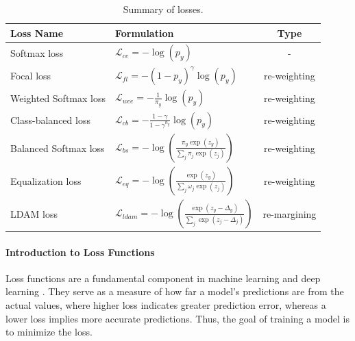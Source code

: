 \begin{table}[H]
    \centering
    \caption{Summary of losses.}
    \label{tab:loss_summary}
    \begin{tabular}{|l|l|c|}
    \hline
    \textbf{Loss Name}       & \textbf{Formulation}                                                & \textbf{Type}        \\ \hline
    Softmax loss \cite{pytorch_crossentropy}             & $\mathcal{L}_{ce} = - \log(p_y)$                                              & -                   \\
    Focal loss \cite{lin2018focallossdenseobject}     & $\mathcal{L}_{fl} = -(1 - p_y)^\gamma \log(p_y)$                             & re-weighting        \\
    Weighted Softmax loss \cite{zhang2023deep}    & $\mathcal{L}_{wce} = - \frac{1}{\pi_y} \log(p_y)$                           & re-weighting        \\
    Class-balanced loss \cite{cui2019classbalancedlossbasedeffective} & $\mathcal{L}_{cb} = - \frac{1 - \gamma}{1 - \gamma^{n_y}} \log(p_y)$         & re-weighting        \\
    Balanced Softmax loss \cite{ren2020balancedmetasoftmaxlongtailedvisual} & $\mathcal{L}_{bs} = - \log\left( \frac{\pi_y \exp(z_y)}{\sum_j \pi_j \exp(z_j)} \right)$ & re-weighting        \\
    Equalization loss \cite{tan2020equalizationlosslongtailedobject} & $\mathcal{L}_{eq} = - \log\left( \frac{\exp(z_y)}{\sum_j \omega_j \exp(z_j)} \right)$    & re-weighting        \\
    LDAM loss \cite{cao2019learningimbalanceddatasetslabeldistributionaware}      & $\mathcal{L}_{ldam} = - \log\left( \frac{\exp(z_y - \Delta_y)}{\sum_j \exp(z_j - \Delta_j)} \right)$ & re-margining        \\
    \hline
    \end{tabular}
\end{table}


\paragraph{Introduction to Loss Functions}
Loss functions are a fundamental component in machine learning and deep learning \cite{zhang2023dive,Goodfellow-et-al-2016}. They serve as a measure of how far a model's predictions are from the actual values, where higher loss indicates greater prediction error, whereas a lower loss implies more accurate predictions. Thus, the goal of training a model is to minimize the loss. 

